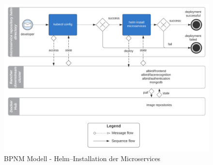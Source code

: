 \begin{figure}[!htb]
    \centering
    \includegraphics[width=1.0\columnwidth]{images/BPMNHelm.png}
    \caption{BPNM Modell - Helm--Installation der Microservices}
    \label{fig:HelmInstallation}
\end{figure}





